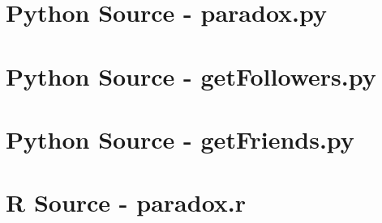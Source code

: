 \documentclass[letterpaper,11pt]{report}
\begin{document}



\appendix
{}

\chapter{Python Source - paradox.py} \label{chap:paradox}

\chapter{Python Source - getFollowers.py} \label{chap:getFollowers}

\chapter{Python Source - getFriends.py} \label{chap:getFriends}


\chapter{R Source - paradox.r} \label{chap:p}

\end{document}
